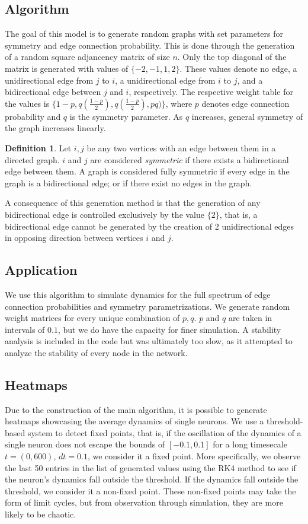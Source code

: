 \documentclass{article}
\theoremstyle{definition}
\newtheorem{defn}[thm]{Definition}
\theoremstyle{remark}
\begin{document}
\subsection{Algorithm}
The goal of this model is to generate random graphs with set parameters for symmetry and edge connection probability. This is done through the generation of a random square adjancency matrix of size $n$. Only the top diagonal of the matrix is generated with values of $\{-2,-1,1,2\}$. These values denote no edge, a unidirectional edge from $j$ to $i$, a unidirectional edge from $i$ to $j$, and a bidirectional edge between $j$ and $i$, respectively. The respective weight table for the values is $\{1-p, q(\frac{1-p}{2} ), q(\frac{1-p}{2} ), pq)\}$, where $p$ denotes edge connection probability and $q$ is the symmetry parameter. As $q$ increases, general symmetry of the graph increases linearly.
\begin{defn}
Let $i,j$ be any two vertices with an edge between them in a directed graph. $i$ and $j$ are considered \textit{symmetric} if there exists a bidirectional edge between them. A graph is considered fully symmetric if every edge in the graph is a bidirectional edge; or if there exist no edges in the graph.
\end{defn}
A consequence of this generation method is that the generation of any bidirectional edge is controlled exclusively by the value $\{2\}$, that is, a bidirectional edge cannot be generated by the creation of 2 unidirectional edges in opposing direction between vertices $i$ and $j$.

\subsection{Application}
We use this algorithm to simulate dynamics for the full spectrum of edge connection probabilities and symmetry parametrizations. We generate random weight matrices for every unique combination of $p,q$. $p$ and $q$ are taken in intervals of $0.1$, but we do have the capacity for finer simulation. A stability analysis is included in the code but was ultimately too slow, as it attempted to analyze the stability of every node in the network.

\subsection{Heatmaps}
Due to the construction of the main algorithm, it is possible to generate heatmaps showcasing the average dynamics of single neurons. We use a threshold-based system to detect fixed points, that is, if the oscillation of the dynamics of a single neuron does not escape the bounds of $[-0.1,0.1]$ for a long timesecale $t=(0,600)$, $dt = 0.1$, we consider it a fixed point. More specifically, we observe the last 50 entries in the list of generated values using the RK4 method to see if the neuron's dynamics fall outside the threshold. If the dynamics fall outside the threshold, we consider it a non-fixed point. These non-fixed points may take the form of limit cycles, but from observation through simulation, they are more likely to be chaotic.
\end{document}
